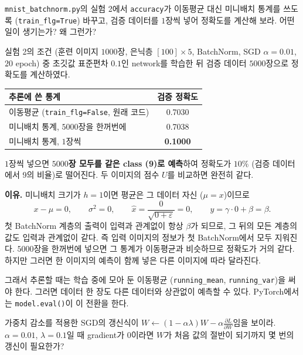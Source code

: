 \documentclass[11pt,a4paper]{article}
\newcommand{\pd}[2]{\frac{\partial #1}{\partial #2}}
\begin{document}
\begin{problems}
\item \texttt{mnist\_batchnorm.py}의 실험 2에서 \texttt{accuracy}가 이동평균 대신 미니배치 통계를 쓰도록
(\texttt{train\_flg=True}) 바꾸고, 검증 데이터를 $1$장씩 넣어 정확도를 계산해 보라.
어떤 일이 생기는가? 왜 그런가?

\begin{sol}
실험 2의 조건 (훈련 이미지 $1000$장, 은닉층 $[100]\times5$, BatchNorm, SGD $\alpha=0.01$, $20$ epoch) 중 초깃값 표준편차 $0.1$인 network를 학습한 뒤 검증 데이터 $5000$장으로 정확도를 계산하였다.
\begin{center}
\begin{tabular}{lc}
\toprule
추론에 쓴 통계 & 검증 정확도 \\
\midrule
이동평균 (\texttt{train\_flg=False}, 원래 코드) & 0.7030 \\
미니배치 통계, $5000$장을 한꺼번에 & 0.7038 \\
미니배치 통계, $1$장씩 & \textbf{0.1000} \\
\bottomrule
\end{tabular}
\end{center}
$1$장씩 넣으면 \textbf{$5000$장 모두를 같은 class (9)로 예측}하여 정확도가 $10\%$ (검증 데이터에서 9의 비율)로 떨어진다.
두 이미지의 점수 $U$를 비교하면 완전히 같다.

\textbf{이유.} 미니배치 크기가 $h=1$이면 평균은 그 데이터 자신 ($\mu=x$)이므로
\[
x-\mu=0,\qquad \sigma^2=0,\qquad \hat x=\frac{0}{\sqrt{0+\varepsilon}}=0,\qquad y=\gamma\cdot0+\beta=\beta .
\]
첫 BatchNorm 계층의 출력이 입력과 관계없이 항상 $\beta$가 되므로, 그 뒤의 모든 계층의 값도 입력과 관계없이 같다.
즉 입력 이미지의 정보가 첫 BatchNorm에서 모두 지워진다.
$5000$장을 한꺼번에 넣으면 그 통계가 이동평균과 비슷하므로 정확도가 거의 같다.
하지만 그러면 한 이미지의 예측이 함께 넣은 다른 이미지에 따라 달라진다.

그래서 추론할 때는 학습 중에 모아 둔 이동평균 (\texttt{running\_mean}, \texttt{running\_var})을 써야 한다.
그러면 데이터 한 장도 다른 데이터와 상관없이 예측할 수 있다.
PyTorch에서는 \texttt{model.eval()}이 이 전환을 한다.
\end{sol}

\item 가중치 감소를 적용한 SGD의 갱신식이 $W\leftarrow(1-\alpha\lambda)W-\alpha\pd{L}{W}$임을 보이라.
$\alpha=0.01$, $\lambda=0.1$일 때 gradient가 $0$이라면 $W$가 처음 값의 절반이 되기까지 몇 번의 갱신이 필요한가?


\end{problems}
\end{document}
